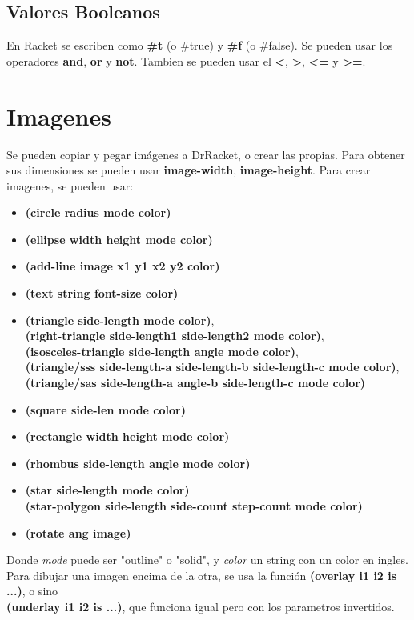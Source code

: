 \documentclass[11pt,a4paper]{article}
\begin{document}
\subsection{Valores Booleanos}
En Racket se escriben como \textbf{\#t} (o \#true) y \textbf{\#f} (o \#false). Se pueden usar los operadores \textbf{and}, \textbf{or} y \textbf{not}. Tambien se pueden usar el \textbf{<}, \textbf{>}, \textbf{<=} y \textbf{>=}.

\section{Imagenes}
Se pueden copiar y pegar imágenes a DrRacket, o crear las propias. Para obtener sus dimensiones se pueden usar \textbf{image-width}, \textbf{image-height}. Para crear imagenes, se pueden usar:
\begin{itemize}
\item \textbf{(circle radius mode color)}
\item \textbf{(ellipse width height mode color)}
\item \textbf{(add-line image x1 y1 x2 y2 color)}
\item \textbf{(text string font-size color)}
\item \textbf{(triangle side-length mode color)},\\ \textbf{(right-triangle side-length1 side-length2 mode color)},\\ \textbf{(isosceles-triangle side-length angle mode color)},\\ \textbf{(triangle/sss side-length-a side-length-b side-length-c mode color)},\\ \textbf{(triangle/sas side-length-a angle-b side-length-c mode color)}
\item \textbf{(square side-len mode color)}
\item \textbf{(rectangle width height mode color)}
\item \textbf{(rhombus side-length angle mode color)}
\item \textbf{(star side-length mode color)}\\ \textbf{(star-polygon side-length side-count step-count mode color)}
\item \textbf{(rotate ang image)}
\end{itemize}

\noindent Donde \textit{mode} puede ser "outline" o "solid", y \textit{color} un string con un color en ingles.\\

\noindent Para dibujar una imagen encima de la otra, se usa la funci\'on \textbf{(overlay i1 i2 is ...)}, o sino\\ \textbf{(underlay i1 i2 is ...)}, que funciona igual pero con los parametros invertidos.\\
\end{document}
